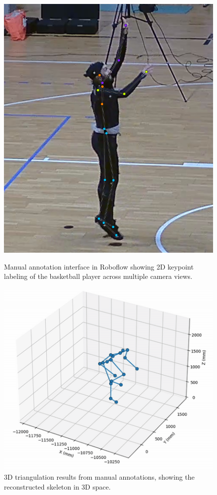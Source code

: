 \documentclass[11pt,a4paper]{article}
\begin{document}
\begin{figure}[htbp]
\centering
\begin{minipage}{0.35\textwidth}
  \centering
  \includegraphics[width=\textwidth]{samples/roboflow_annotation.png}
  \caption{Manual annotation interface in Roboflow showing 2D keypoint labeling of the basketball player across multiple camera views.}
  \label{fig:roboflow}
\end{minipage}
\hfill
\begin{minipage}{0.48\textwidth}
  \centering
  \includegraphics[width=\textwidth]{samples/triangulation_manual_annotation.png}
  \caption{3D triangulation results from manual annotations, showing the reconstructed skeleton in 3D space.}
  \label{fig:triangulation}
\end{minipage}
\end{figure}
\end{document}
